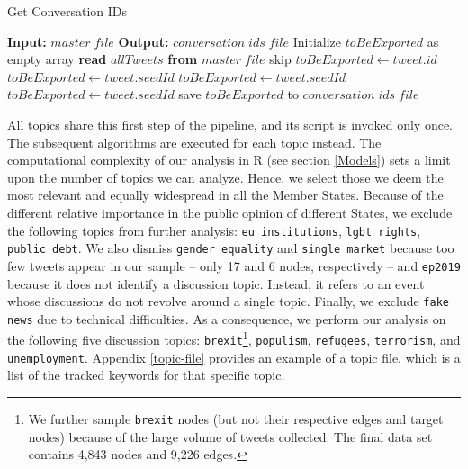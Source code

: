 \begin{algorithm}[ht]
  \caption{Get Conversation IDs}\label{getConversationId}
  \begin{algorithmic}[1]
  \State \textbf{Input:} $master\;file$
  \State \textbf{Output:} $conversation\;ids\;file$
  \State Initialize $toBeExported$ as empty array
  \State \textbf{read} $allTweets$ \textbf{from} $master\;file$
      \State skip
    \EndIf
      \State $toBeExported\gets tweet.id$
        \State $toBeExported\gets tweet.seedId$
      \EndIf
        \State $toBeExported\gets tweet.seedId$
      \EndIf
        \State $toBeExported\gets tweet.seedId$
      \EndIf
    \EndIf
  \EndFor
  \State save $toBeExported$ to $conversation\;ids\;file$
  \end{algorithmic}
\end{algorithm}

All topics share this first step of the pipeline, and its script is invoked only once. The subsequent algorithms are executed for each topic instead. The computational complexity of our analysis in R (see section \vref{Models}) sets a limit upon the number of topics we can analyze. Hence, we select those we deem the most relevant and equally widespread in all the Member States. Because of the different relative importance in the public opinion of different States, we exclude the following topics from further analysis: \texttt{eu institutions}, \texttt{lgbt rights}, \texttt{public debt}. We also dismiss \texttt{gender equality} and \texttt{single market} because too few tweets appear in our sample – only 17 and 6 nodes, respectively – and \texttt{ep2019} because it does not identify a discussion topic. Instead, it refers to an event whose discussions do not revolve around a single topic. Finally, we exclude \texttt{fake news} due to technical difficulties. As a consequence, we perform our analysis on the following five discussion topics: \texttt{brexit}\footnote{We further sample \texttt{brexit} nodes (but not their respective edges and target nodes) because of the large volume of tweets collected. The final data set contains 4,843 nodes and 9,226 edges.}, \texttt{populism}, \texttt{refugees}, \texttt{terrorism}, and \texttt{unemployment}.
Appendix \vref{topic-file} provides an example of a topic file, which is a list of the tracked keywords for that specific topic.

